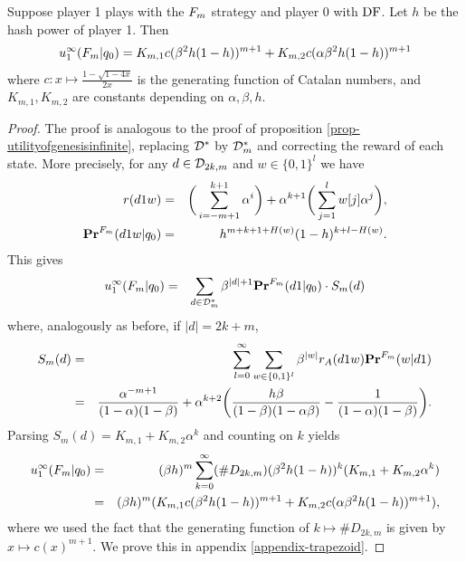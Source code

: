 \begin{myprop}
	Suppose player 1 plays with the $F_m$ strategy and player 0 with $\text{\rm DF}$. Let $h$ be the hash power of player 1. Then
	\begin{eqnarray*}
		u_1^\infty(F_m|q_0) =K_{m,1}c(\beta^2h(1-h))^{m+1}+K_{m,2}c(\alpha\beta^2h(1-h))^{m+1}
	\end{eqnarray*}
	where $c:x\mapsto \frac{1-\sqrt{1-4x}}{2x}$ is the generating function of Catalan numbers, and $K_{m,1},K_{m,2}$ are constants depending on $\alpha,\beta,h$.
\end{myprop}
\begin{proof}
The proof is analogous to the proof of proposition \ref{prop-utilityofgenesisinfinite}, replacing $\mathcal{D}^\ast$ by $\mathcal{D}_{m}^\ast$ and correcting the reward of each state. More precisely, for any $d\in \mathcal{D}_{2k,m}$ and $w\in \{0,1\}^l$ we have
\begin{eqnarray*}
 r(d1w) &=& \bigg(\sum_{i=-m+1}^{k+1}\alpha^i\bigg)+\alpha^{k+1}\bigg(\sum_{j=1}^{l}w[j]\alpha^j\bigg),\\
 \mathbf{Pr}^{F_m}(d1w|q_0) &=& h^{m+k+1+H(w)}(1-h)^{k+l-H(w)}.
\end{eqnarray*}
This gives
	\begin{eqnarray*}
	u^\infty_1(F_m|q_0)&=& \sum_{d\in \mathcal{D}^\ast_{m}}\beta ^{|d|+1}\mathbf{Pr}^{F_m} (d1|q_0) \cdot S_m(d)
\end{eqnarray*}
where, analogously as before, if $|d|=2k+m$,
\begin{eqnarray*}
	S_m(d)      &=& \sum_{l=0}^{\infty}\sum_{w\in \{0,1\}^l}\beta^{|w|}r_A(d1w)\mathbf{Pr}^{F_m}(w|d1)\\
	&=& \frac{\alpha^{-m+1}}{(1-\alpha)(1-\beta)}+\alpha^{k+2}\bigg(\frac{h\beta}{(1-\beta)(1-\alpha\beta)}-\frac{1}{(1-\alpha)(1-\beta)}\bigg).
\end{eqnarray*}
Parsing $S_m(d)=K_{m,1}+K_{m,2}\alpha^{k}$ and counting on $k$ yields
\begin{eqnarray*}
	u^\infty_1(F_m|q_0)&=& (\beta h)^m \sum_{k=0}^{\infty}(\# D_{2k,m})(\beta^2 h(1-h))^k(K_{m,1}+K_{m,2}\alpha^k)\\
                          &=& (\beta h)^m(K_{m,1}c(\beta^2 h(1-h))^{m+1}+K_{m,2}c(\alpha\beta^2 h (1-h))^{m+1}),
\end{eqnarray*}
where we used the fact that the generating function of $k\mapsto \#D_{2k,m}$ is given by $x\mapsto c(x)^{m+1}$. We prove this in appendix \ref{appendix-trapezoid}.
\end{proof}



